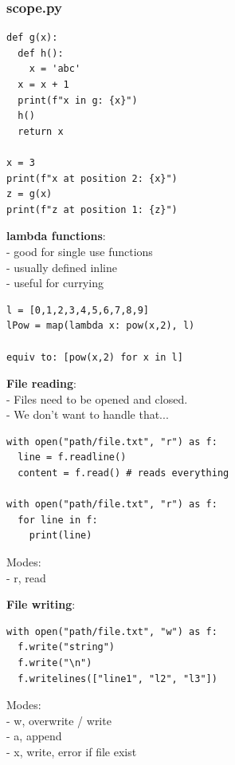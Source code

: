 \documentclass{beamer}
\begin{document}
\begin{frame}[fragile]
	\frametitle{scope.py}
	\begin{example}
		\begin{verbatim}
def g(x):
  def h():
	x = 'abc'
  x = x + 1
  print(f"x in g: {x}")
  h()
  return x
		
x = 3
print(f"x at position 2: {x}")
z = g(x)
print(f"z at position 1: {z}")
		\end{verbatim}
	\end{example}
\end{frame}

\begin{frame}[fragile]
	\textbf{lambda functions}:\\
	- good for single use functions\\
	- usually defined inline\\
	- useful for currying
\begin{example}{}
\begin{verbatim}
l = [0,1,2,3,4,5,6,7,8,9]
lPow = map(lambda x: pow(x,2), l)

equiv to: [pow(x,2) for x in l]	

\end{verbatim}
\end{example}
\end{frame}

\begin{frame}[fragile]
	\textbf{File reading}:\\
	- Files need to be opened and closed.\\
	- We don't want to handle that...\\
	\begin{example}
		\begin{verbatim}
with open("path/file.txt", "r") as f:
  line = f.readline()
  content = f.read() # reads everything

with open("path/file.txt", "r") as f: 
  for line in f:
    print(line)
		\end{verbatim}
		Modes:\\
		- r, read\\
	\end{example}
\end{frame}
\begin{frame}[fragile]
	\textbf{File writing}:\\
	\begin{example}
		\begin{verbatim}
with open("path/file.txt", "w") as f:
  f.write("string")
  f.write("\n")
  f.writelines(["line1", "l2", "l3"])
	\end{verbatim}
		Modes:\\
		- w, overwrite / write\\
		- a, append\\
		- x, write, error if file exist
	\end{example}
\end{frame}
\end{document}
